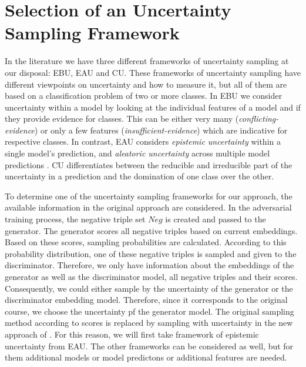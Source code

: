 \section{Selection of an Uncertainty Sampling Framework} 
\label{sec:selection_of_an_uncertainty_sampling_type}

In the literature we have three different frameworks of uncertainty sampling at our disposal:
\ac{EBU}, \ac{EAU} and \ac{CU}.
These frameworks of uncertainty sampling have different viewpoints on uncertainty and how to measure it, but all of them are based on a classification problem of two or more classes.
In \ac{EBU} we consider uncertainty within a model by looking at the individual features of a model and if they provide evidence for classes.
This can be either very many (\textit{conflicting-evidence}) or only a few features (\textit{insufficient-evidence}) which are indicative for respective classes.
In contrast, \ac{EAU} considers \textit{epistemic uncertainty} within a single model’s prediction, and \textit{aleatoric uncertainty} across multiple model predictions \cite{human-in-the-loop}.
\Ac{CU} differentiates between the reducible and irreducible part of the uncertainty in a prediction and the domination of one class over the other.

To determine one of the uncertainty sampling frameworks for our approach, the available information in the original \kbgan approach are considered.
In the adversarial training process, the negative triple set $Neg$ is created and passed to the generator.
The generator scores all negative triples based on current embeddings.
Based on these scores, sampling probabilities are calculated.
According to this probability distribution, one of these negative triples is sampled and given to the discriminator.
Therefore, we only have information about the embeddings of the generator as well as the discriminator model, all negative triples and their scores.
Consequently, we could either sample by the uncertainty of the generator or the discriminator embedding model.
Therefore, since it corresponds to the original course, we choose the uncertainty pf the generator model.
The original sampling method according to scores is replaced by sampling with uncertainty in the new approach of \usgan.
For this reason, we will first take framework of epistemic uncertainty from \ac{EAU}.
The other frameworks can be considered as well, but for them additional models or model predictons or additional features are needed.

